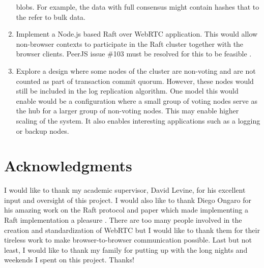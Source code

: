 \documentclass[9pt]{extarticle}
\begin{document}
\begin{multicols}{2}
\begin{enumerate}
    blobs. For example, the data with full consensus might contain
    hashes that to the refer to bulk data.
\item Implement a Node.js based Raft over WebRTC application. This
    would allow non-browser contexts to participate in the Raft
    cluster together with the browser clients. PeerJS issue \#103 must
    be resolved for this to be feasible \cite{peerjs:103}.
\item Explore a design where some nodes of the cluster are non-voting
    and are not counted as part of transaction commit quorum. However,
    these nodes would still be included in the log replication
    algorithm. One model this would enable would be a configuration
    where a small group of voting nodes serve as the hub for a larger
    group of non-voting nodes. This may enable higher scaling of the
    system. It also enables interesting applications such as a logging
    or backup nodes.
\end{enumerate}


\section*{Acknowledgments}
I would like to thank my academic supervisor, David Levine, for his
excellent input and oversight of this project. I would also like to
thank Diego Ongaro for his amazing work on the Raft protocol and paper
\cite[p.~215]{lamport78} which made implementing
a Raft implementation a pleasure \cite{lamport78}.
There are too many people involved in the creation and standardization
of WebRTC but I would like to thank them for their tireless work to
make browser-to-browser communication possible. Last but not least,
I would like to thank my family for putting up with the long nights
and weekends I spent on this project. Thanks!

\end{multicols}

\printbibliography[title={General references},notkeyword=rtc-general,notkeyword=rtc-transport,notkeyword=rtc-framing]

\nocite{draft-rtcweb-overview}
\nocite{draft-rtcweb-security-arch}
\nocite{draft-rtcweb-security}
\printbibliography[title={WebRTC general references},keyword=rtc-general]

\nocite{draft-rtcweb-transports}
\nocite{draft-rtcweb-qos}
\nocite{RFC4960:sctp}
\nocite{RFC3758:sctp-reliability}
\nocite{draft-sctp-dtls-encaps}
\nocite{draft-mmusic-sctp-sdp}
\nocite{draft-sctp-ndata}
\nocite{draft-rtcweb-rtp-usage}
\nocite{draft-rtcweb-data-channel}
\nocite{draft-rtcweb-data-protocol}
\nocite{draft-rtcweb-alpn}
\nocite{RFC5245:ice}
\nocite{RFC5128:p2p-nat}
\nocite{RFC5389:stun}
\nocite{RFC3489:stun-udp}
\nocite{RFC5766:turn}
\nocite{RFC6156:turn-ipv6}
\nocite{RFC6544:tcp-ice}
\nocite{RFC4571:rtp-rtcp}
\nocite{RFC5764:dtls-srtp}
\printbibliography[title={WebRTC data transport},keyword=rtc-transport]
\end{document}
